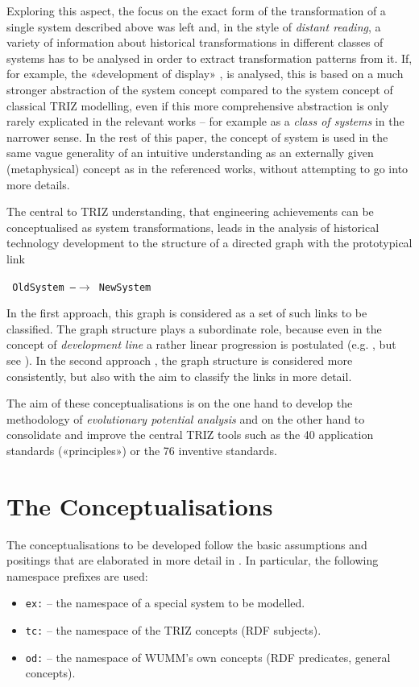 \documentclass[11pt,a4paper]{article}
\begin{document}
Exploring this aspect, the focus on the exact form of the transformation of a
single system described above was left and, in the style of \emph{distant
  reading}, a variety of information about historical transformations in
different classes of systems has to be analysed in order to extract
transformation patterns from it.  If, for example, the «development of
display» \cite[p. 22]{TESE2018}, \cite[ch. 5]{Shpakovsky2016} is analysed,
this is based on a much stronger abstraction of the system concept compared to
the system concept of classical TRIZ modelling, even if this more
comprehensive abstraction is only rarely explicated in the relevant works --
for example as a \emph{class of systems} in the narrower sense. In the rest of
this paper, the concept of system is used in the same vague generality of an
intuitive understanding as an externally given (metaphysical) concept as in
the referenced works, without attempting to go into more details.

The central to TRIZ understanding, that engineering achievements can be
conceptualised as system transformations, leads in the analysis of historical
technology development to the structure of a directed graph with the
prototypical link
\begin{center}\tt
  OldSystem \textrm{---}$\to$ NewSystem
\end{center}
In the first approach, this graph is considered as a set of such links to be
classified. The graph structure plays a subordinate role, because even in the
concept of \emph{development line} a rather linear progression is postulated
(e.g. \cite[Figure 4.104]{KS}, but see \cite[4.8.4 and Figure 4.72]{KS}). In
the second approach \cite{Shpakovsky2016}, the graph structure is considered
more consistently, but also with the aim to classify the links in more detail.

The aim of these conceptualisations is on the one hand to develop the
methodology of \emph{evolutionary potential analysis} \cite[4.8.7]{KS} and on
the other hand to consolidate and improve the central TRIZ tools such as the
40 application standards («principles») or the 76 inventive standards.

\section{The Conceptualisations}

The conceptualisations to be developed follow the basic assumptions and
positings that are elaborated in more detail in \cite{Graebe2021}. In
particular, the following namespace prefixes are used:
\begin{itemize}[noitemsep]
\item \texttt{ex:} -- the namespace of a special system to be modelled. 
\item \texttt{tc:} -- the namespace of the TRIZ concepts (RDF subjects).
\item \texttt{od:} -- the namespace of WUMM's own concepts (RDF predicates,
  general concepts). 
\end{itemize}
\end{document}

